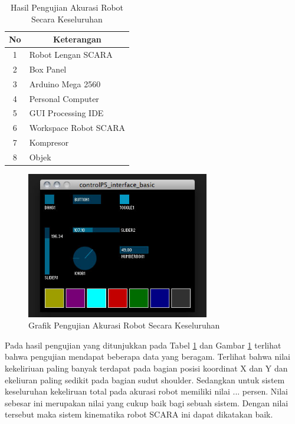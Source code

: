 \begin{table}[H]
	\centering
	\caption{Hasil Pengujian Akurasi Robot Secara Keseluruhan}
	\label{tbl.akurasikeseluruhan}
	\begin{tabular}{|c|l|}
		\hline
		\rowcolor[HTML]{9B9B9B} 
		
		No & \multicolumn{1}{c|}{\cellcolor[HTML]{9B9B9B}Keterangan} \\ \hline
		1  & Robot Lengan SCARA                                      \\ \hline
		2  & Box Panel                                               \\ \hline
		3  & Arduino Mega 2560                                       \\ \hline
		4  & Personal Computer                                       \\ \hline
		5  & GUI Processing IDE                                      \\ \hline
		6  & Workspace Robot SCARA                                   \\ \hline
		7  & Kompresor                                               \\ \hline
		8  & Objek                                                   \\ \hline
	\end{tabular}
	
\end{table} 
\begin{figure}[H]
	\centering
	\includegraphics[width=8cm]{gambar/controlp5.jpg}
	\caption{Grafik Pengujian Akurasi Robot Secara Keseluruhan}
	\label{pic.akurasikeseluruhan}
\end{figure}

Pada hasil pengujian yang ditunjukkan pada Tabel \ref{tbl.akurasikeseluruhan} dan Gambar \ref{pic.akurasikeseluruhan} terlihat bahwa pengujian mendapat beberapa data yang beragam. Terlihat bahwa nilai kekeliriuan paling banyak terdapat pada bagian posisi koordinat X dan Y dan ekeliuran paling sedikit pada bagian sudut shoulder. Sedangkan untuk sistem keseluruhan kekeliruan total pada akurasi robot memiliki nilai ... persen. Nilai sebesar ini merupakan nilai yang cukup baik bagi sebuah sistem. Dengan nilai tersebut maka sistem kinematika robot SCARA ini dapat dikatakan baik. 
